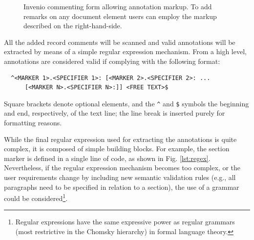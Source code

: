 \begin{figure}[!ht]
  \centering
  \caption[Invenio commenting form allowing annotation markup]
          {Invenio commenting form allowing annotation markup. To add remarks
           on any document element users can employ the markup described on the
           right-hand-side.}
  \label{fig:noteform}
\end{figure}

All the added record comments will be scanned and valid annotations will be
extracted by means of a simple regular expression mechanism. From a high level,
annotations are considered valid if complying with the following format:
\begin{verbatim}
  ^<MARKER 1>.<SPECIFIER 1>: [<MARKER 2>.<SPECIFIER 2>: ...
      [<MARKER N>.<SPECIFIER N>:]] <FREE TEXT>$
\end{verbatim}
Square brackets denote optional elements, and the \texttt{\^} and \texttt{\$}
symbols the beginning and end, respectively, of the text line; the line break
is inserted purely for formatting reasons.

While the final regular expression used for extracting the annotations is quite
complex, it is composed of simple building blocks. For example, the section
marker is defined in a single line of code, as shown in Fig. \ref{lst:regex}.
Nevertheless, if the regular expression mechanism becomes too complex, or the
user requirements change by including new semantic validation rules (e.g., all
paragraphs need to be specified in relation to a section), the use of a grammar
could be considered\footnote{Regular expressions have the same expressive power
as regular grammars (most restrictive in the Chomsky hierarchy) in formal
language theory.}.

